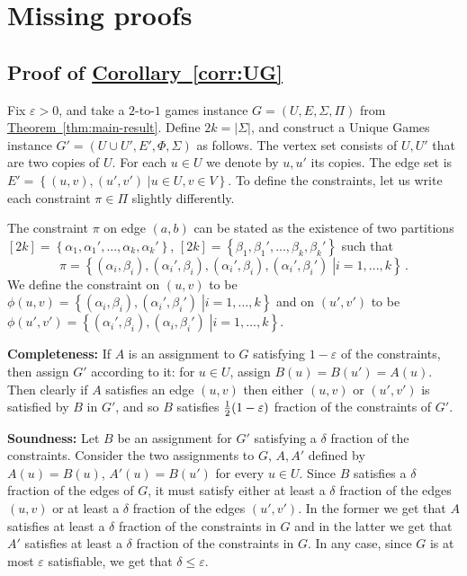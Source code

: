 \documentclass[11pt]{article}
\numberwithin{equation}{section}
\theoremstyle{definition}
\theoremstyle{plain}
\newcommand{\expref}[2]{\hyperref[#2]{#1~\ref{#2}}}
\newcommand\card[1]{\left| {#1} \right|}
\newcommand\sett[2]{\left\{ \left. #1 \;\right\vert #2 \right\}}
\newcommand\set[1]{{\left\{ #1 \right\}}}
\newcommand\half{{1\over2}}
\newcommand\eps{\varepsilon}
\renewcommand\leq{\leqslant}
\begin{document}
%


\appendix
\section{Missing proofs}
\subsection{Proof of \expref{Corollary}{corr:UG}}\label{sec:proof_ugc_cor}
Fix $\eps>0$, and take a $2$-to-$1$ games instance $G=(U,E,\Sigma,\Pi)$ from \expref{Theorem}{thm:main-result}.
Define $2k=\card{\Sigma}$, and construct a Unique Games instance $G' = (U\cup U', E',\Phi,\Sigma)$ as follows.
The vertex set consists of $U,U'$ that are two copies of $U$. For each $u\in U$ we denote by
$u, u'$ its copies. The edge set is $E' = \sett{(u,v),(u',v')}{u\in U, v\in V}$. To define the constraints,
let us write each constraint $\pi\in \Pi$ slightly differently.

The constraint $\pi$ on edge $(a,b)$ can be stated as the existence of two partitions $[2k] = \set{\alpha_1,\alpha_1',...,\alpha_k,\alpha_k'}$, $[2k] = \set{\beta_1,\beta_1',...,\beta_k,\beta_k'}$
such that
\[
\pi=\sett{(\alpha_i,\beta_i),(\alpha_i',\beta_i),(\alpha_i',\beta_i),(\alpha_i',\beta_i')}{i=1,...,k}\,.
\]
We define
the constraint on $(u,v)$ to be
$\phi(u,v)=\sett{(\alpha_i,\beta_i),(\alpha_i',\beta_i')}{i=1,...,k}$ and on
$(u',v')$ to be $\phi(u',v')=\sett{(\alpha_i',\beta_i),(\alpha_i,\beta_i')}{ i=1,...,k}$.

\textbf{Completeness:} If $A$ is an assignment to $G$ satisfying $1-\eps$ of the constraints, then assign $G'$ according to it:
for $u\in U$, assign $B(u)=B(u')=A(u)$. Then clearly if $A$ satisfies an edge $(u,v)$ then either $(u,v)$ or $(u',v')$ is
satisfied by $B$ in $G'$, and so $B$ satisfies $\half(1-\eps)$ fraction of the constraints of $G'$.

\textbf{Soundness:} Let $B$ be an assignment for $G'$ satisfying
a %
$\delta$ fraction of the constraints. Consider the two
assignments to $G$, $A,A'$ defined by $A(u) = B(u)$, $A'(u)=B(u')$ for every $u\in U$. Since $B$ satisfies
a %
$\delta$
fraction of the edges of $G$, it must satisfy either at least
a %
$\delta$ fraction of the edges $(u,v)$ or at least
a %
$\delta$ fraction of the edges $(u',v')$. In the former we get that $A$ satisfies at least
a %
$\delta$ fraction
of the constraints in $G$ and in the latter we get that $A'$ satisfies at least
a %
$\delta$ fraction of the
constraints in $G$. In any case, since $G$ is at most $\eps$ satisfiable, we get that $\delta\leq \eps$.
\end{document}
